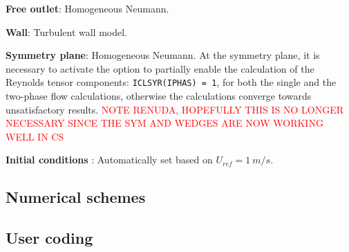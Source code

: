 \documentclass[a4paper,twoside,12pt]{article}
\begin{document}
\begin{itemize}
\begin{description}
\begin{description}
         \end{description}

   \item[-]\textbf{Free outlet}: Homogeneous Neumann.
   \item[-]\textbf{Wall}: Turbulent wall model.
   \item[-]\textbf{Symmetry plane}: Homogeneous Neumann. At the symmetry plane, it is necessary to activate the option to partially enable the calculation of the Reynolds tensor components: \texttt{ICLSYR(IPHAS) = 1}, for both the single and the two-phase flow calculations, otherwise the calculations converge towards unsatisfactory results.  \textcolor{red}{NOTE RENUDA, HOPEFULLY THIS IS NO LONGER NECESSARY SINCE THE SYM AND WEDGES ARE NOW WORKING WELL IN CS}

   \item[-]\textbf{Initial conditions} : Automatically set based on $U_{ref}=1~m/s$.
\end{description}

\end{itemize}

\subsection{Numerical schemes}


\subsection{User coding}
\end{document}
